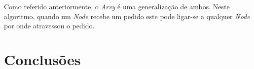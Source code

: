 Como referido anteriormente, o \emph{Arvy} é uma generalização de ambos. Neste algoritmo, quando um \emph{Node} recebe um pedido este pode ligar-se a qualquer \emph{Node} por onde atravessou o pedido.




\section{Conclusões}
\label{chap2:sec:concs}
